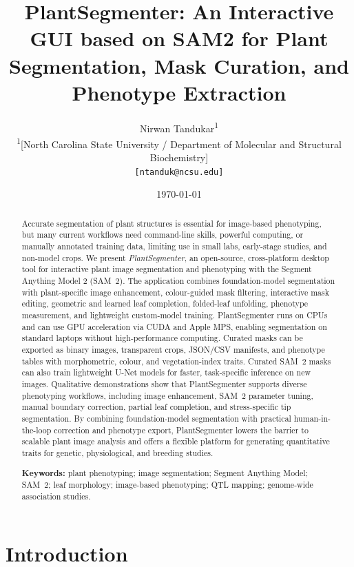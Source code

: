 \documentclass[12pt, a4paper]{article}
\title{\textbf{PlantSegmenter: An Interactive GUI based on SAM2 for Plant Segmentation, Mask Curation, and Phenotype Extraction}}
\author{
  Nirwan Tandukar\textsuperscript{1} \\[4pt]
  \textsuperscript{1}[North Carolina State University / Department of Molecular and Structural Biochemistry]\\
  \texttt{[ntanduk@ncsu.edu]}
}
\date{\today}
\begin{document}
\maketitle
\linenumbers

\begin{abstract}
Accurate segmentation of plant structures is essential for image-based
phenotyping, but many current workflows need command-line skills, powerful
computing, or manually annotated training data, limiting use in small labs,
early-stage studies, and non-model crops. We present \textit{PlantSegmenter}, an
open-source, cross-platform desktop tool for interactive plant image
segmentation and phenotyping with the Segment Anything Model 2 (SAM~2). The
application combines foundation-model segmentation with plant-specific image
enhancement, colour-guided mask filtering, interactive mask editing, geometric
and learned leaf completion, folded-leaf unfolding, phenotype measurement, and
lightweight custom-model training. PlantSegmenter runs on CPUs and can use GPU
acceleration via CUDA and Apple MPS, enabling segmentation on standard laptops
without high-performance computing. Curated masks can be exported as binary
images, transparent crops, JSON/CSV manifests, and phenotype tables with
morphometric, colour, and vegetation-index traits. Curated SAM~2 masks can also
train lightweight U-Net models for faster, task-specific inference on new
images. Qualitative demonstrations show that PlantSegmenter supports diverse
phenotyping workflows, including image enhancement, SAM~2 parameter tuning,
manual boundary correction, partial leaf completion, and stress-specific tip
segmentation. By combining foundation-model segmentation with practical
human-in-the-loop correction and phenotype export, PlantSegmenter lowers the
barrier to scalable plant image analysis and offers a flexible platform for
generating quantitative traits for genetic, physiological, and breeding studies.

\textbf{Keywords:} plant phenotyping; image segmentation; Segment Anything Model;
SAM~2; leaf morphology; image-based phenotyping; QTL mapping; genome-wide
association studies.
\end{abstract}

\newpage


\section{Introduction}
\label{sec:introduction}
\end{document}
